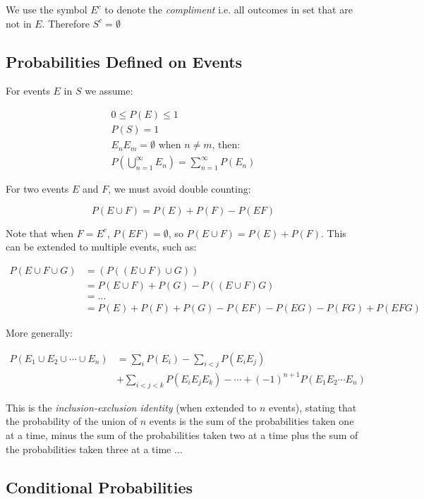 \documentclass{article}
\begin{document}
We use the symbol $E^c$ to denote the \textit{compliment} i.e. all outcomes in 
set that are not in $E$. Therefore $S^c = \emptyset$

\subsection{Probabilities Defined on Events}

For events $E$ in $S$ we assume:

\begin{gather}
    0 \le P(E) \le 1 \\
    P(S) = 1 \\
    E_n E_m = \emptyset \text{ when } n \neq m \text{, then:} \\
    P\left(\bigcup_{n = 1}^{\infty}E_n\right) = \sum_{n = 1}^\infty P(E_n)
\end{gather}

For two events $E$ and $F$, we must avoid double counting:

\begin{equation}
    P(E \cup F) = P(E) + P(F) - P(EF)
\end{equation}

Note that when $F = E^c$, $P(EF) = \emptyset$, so $P(E \cup F) = P(E) + P(F)$. 
This can be extended to multiple events, such as:

\begin{align*}
    P(E \cup F \cup G) &= (P((E \cup F) \cup G)) \\
    &= P(E \cup F) + P(G) - P((E \cup F)G) \\
    &= ... \\
    &= P(E) + P(F) + P(G) - P(EF) - P(EG) - P(FG) + P(EFG)
\end{align*}

More generally:

\begin{align*}
    P(E_1 \cup E_2 \cup \cdots \cup E_n) &= \sum_i P(E_i) - \sum_{i<j}P(E_i E_j) \\
    &+ \sum_{i<j<k}P(E_i E_j E_k) - \cdots +(-1)^{n+1}P(E_1 E_2 \cdots E_n)
\end{align*}

This is the \textit{inclusion-exclusion identity} (when extended to $n$ events),
stating that the probability of the union of $n$ events is the sum of the 
probabilities taken one at a time, minus the sum of the probabilities taken
two at a time plus the sum of the probabilities taken three at a time ...

\subsection{Conditional Probabilities}
\end{document}
